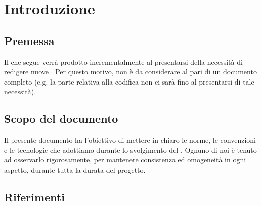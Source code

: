 \section{Introduzione} \label{introduzione}

    

    \subsection{Premessa}
    Il  che segue verrà prodotto incrementalmente al presentarsi della necessità di redigere nuove .
    Per questo motivo, non è da considerare al pari di un documento completo (e.g. la parte relativa alla codifica non ci sarà fino
    al presentarsi di tale necessità).

    \subsection{Scopo del documento}
    Il presente documento ha l’obiettivo di mettere in chiaro le norme, le convenzioni e le tecnologie che adottiamo durante lo svolgimento del .
    Ognuno di noi \`e tenuto ad osservarlo rigorosamente, per mantenere consistenza ed omogeneit\`a in ogni aspetto, durante tutta la durata del progetto.

    


\subsection{Riferimenti}

